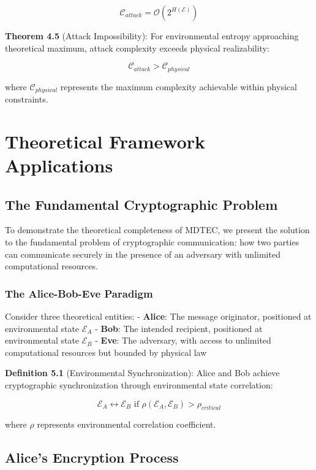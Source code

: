 \documentclass[12pt]{article}
\begin{document}
$$\mathcal{C}_{attack} = \mathcal{O}(2^{H(\mathcal{E})})$$

\textbf{Theorem 4.5} (Attack Impossibility): For environmental entropy approaching theoretical maximum, attack complexity exceeds physical realizability:

$$\mathcal{C}_{attack} > \mathcal{C}_{physical}$$

where $\mathcal{C}_{physical}$ represents the maximum complexity achievable within physical constraints.

\section{Theoretical Framework Applications}

\subsection{The Fundamental Cryptographic Problem}

To demonstrate the theoretical completeness of MDTEC, we present the solution to the fundamental problem of cryptographic communication: how two parties can communicate securely in the presence of an adversary with unlimited computational resources.

\subsubsection{The Alice-Bob-Eve Paradigm}

Consider three theoretical entities:
- \textbf{Alice}: The message originator, positioned at environmental state $\mathcal{E}_A$
- \textbf{Bob}: The intended recipient, positioned at environmental state $\mathcal{E}_B$  
- \textbf{Eve}: The adversary, with access to unlimited computational resources but bounded by physical law

\textbf{Definition 5.1} (Environmental Synchronization): Alice and Bob achieve cryptographic synchronization through environmental state correlation:

$$\mathcal{E}_A \leftrightarrow \mathcal{E}_B \text{ if } \rho(\mathcal{E}_A, \mathcal{E}_B) > \rho_{critical}$$

where $\rho$ represents environmental correlation coefficient.

\subsection{Alice's Encryption Process}
\end{document}
